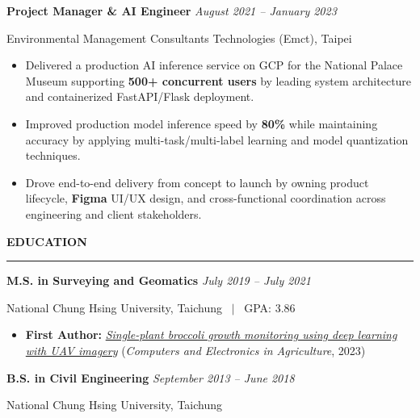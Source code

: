 \documentclass[10pt,a4paper]{article}
\newcommand{\SectionHeader}[1]{%
  \vspace{0.26cm}
  {\large\bfseries\color{customblue}\MakeUppercase{#1}}\par
  \vspace{-0.2cm}
  \noindent\textcolor{customblue}{\rule{\textwidth}{0.6pt}}\par
  \vspace{0.1cm}
}
\newenvironment{workexperience}[4]{%
  \noindent\textbf{\normalsize #1} \hfill {\small\textcolor{customblue}{\textit{#4}}}\par
  \vspace{0.02cm}
  {\small\textcolor{mutedgray}{#2, #3}}\par
  \vspace{-0.13cm}
  \begin{itemize}[leftmargin=0.45cm, labelsep=0.22cm, itemsep=0.05cm, topsep=0.07cm, parsep=0pt]
  \fontsize{9.15pt}{11.55pt}\selectfont
}{%
  \end{itemize}
  \vspace{0.04cm}
}
\begin{document}
\begin{workexperience}{Project Manager \& AI Engineer}{Environmental Management Consultants Technologies (Emct)}{Taipei}{August 2021 -- January 2023}
  \item Delivered a production AI inference service on GCP for the National Palace Museum supporting \textbf{500+ concurrent users} by leading system architecture and containerized FastAPI/Flask deployment.
  \item Improved production model inference speed by \textbf{80\%} while maintaining accuracy by applying multi-task/multi-label learning and model quantization techniques.
  \item Drove end-to-end delivery from concept to launch by owning product lifecycle, \textbf{Figma} UI/UX design, and cross-functional coordination across engineering and client stakeholders.
\end{workexperience}

\vspace{-0.18cm}

\SectionHeader{Education}

\noindent\textbf{\normalsize M.S. in Surveying and Geomatics} \hfill {\small\textcolor{customblue}{\textit{July 2019 -- July 2021}}}\par
\vspace{0.02cm}
{\small\textcolor{mutedgray}{National Chung Hsing University, Taichung \ $|$ \ GPA: 3.86}}\par
\vspace{-0.13cm}
\begin{itemize}[leftmargin=0.45cm, labelsep=0.22cm, itemsep=0.04cm, topsep=0.06cm, parsep=0pt]
  \fontsize{9.15pt}{11.55pt}\selectfont
  \item \textbf{First Author:} \href{https://doi.org/10.1016/j.compag.2023.107739}{\textit{Single-plant broccoli growth monitoring using deep learning with UAV imagery}} (\textit{Computers and Electronics in Agriculture}, 2023)
\end{itemize}
\vspace{0.06cm}

\noindent\textbf{\normalsize B.S. in Civil Engineering} \hfill {\small\textcolor{customblue}{\textit{September 2013 -- June 2018}}}\par
\vspace{0.02cm}
{\small\textcolor{mutedgray}{National Chung Hsing University, Taichung}}\par
\vspace{0.02cm}
\end{document}
